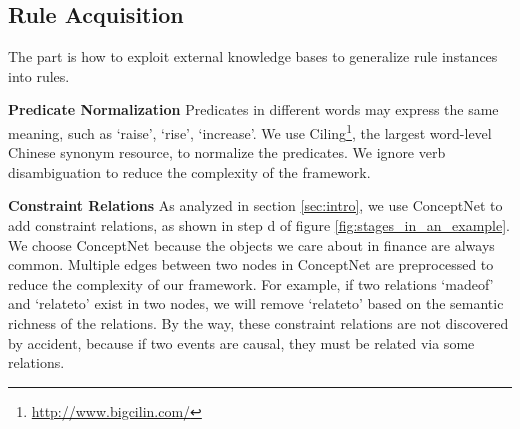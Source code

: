 \subsection{Rule Acquisition}
The part is how to exploit external knowledge bases to generalize rule instances into rules.

\textbf{Predicate Normalization}
Predicates in different words may express the same meaning, such as `raise', `rise', `increase'. We use Ciling\footnote{ \url{ http://www.bigcilin.com/}}, the largest word-level Chinese synonym resource, to normalize the predicates. We ignore verb disambiguation to reduce the complexity of the framework.

\noindent
\textbf{Constraint Relations}
As analyzed in section \ref{sec:intro}, we use ConceptNet to add constraint relations, as shown in step d of figure \ref{fig:stages_in_an_example}. We choose ConceptNet because the objects we care about in finance are always common. Multiple edges between two nodes in ConceptNet are preprocessed to reduce the complexity of our framework.
For example, if two relations `madeof' and `relateto' exist in two nodes, we will remove `relateto' based on the semantic richness of the relations. 
By the way, these constraint relations are not discovered by accident, because if two events are causal, they must be related via some relations.
	

